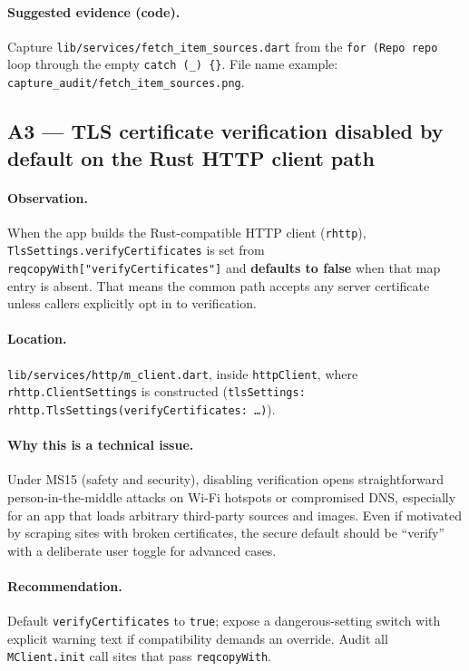 \paragraph{Suggested evidence (code).}
Capture \texttt{lib/services/fetch\_item\_sources.dart} from the \texttt{for (Repo repo} loop through the empty \texttt{catch (\_) \{\}}. File name example: \texttt{capture\_audit/fetch\_item\_sources.png}.

\subsection*{A3 --- TLS certificate verification disabled by default on the Rust HTTP client path}
\paragraph{Observation.}
When the app builds the Rust-compatible HTTP client (\texttt{rhttp}), \texttt{TlsSettings.verifyCertificates} is set from \texttt{reqcopyWith["verifyCertificates"]} and \textbf{defaults to false} when that map entry is absent. That means the common path accepts any server certificate unless callers explicitly opt in to verification.

\paragraph{Location.}
\texttt{lib/services/http/m\_client.dart}, inside \texttt{httpClient}, where \texttt{rhttp.ClientSettings} is constructed (\texttt{tlsSettings: rhttp.TlsSettings(verifyCertificates: \ldots)}).

\paragraph{Why this is a technical issue.}
Under MS15 (safety and security), disabling verification opens straightforward person-in-the-middle attacks on Wi-Fi hotspots or compromised DNS, especially for an app that loads arbitrary third-party sources and images. Even if motivated by scraping sites with broken certificates, the secure default should be ``verify'' with a deliberate user toggle for advanced cases.

\paragraph{Recommendation.}
Default \texttt{verifyCertificates} to \texttt{true}; expose a dangerous-setting switch with explicit warning text if compatibility demands an override. Audit all \texttt{MClient.init} call sites that pass \texttt{reqcopyWith}.

